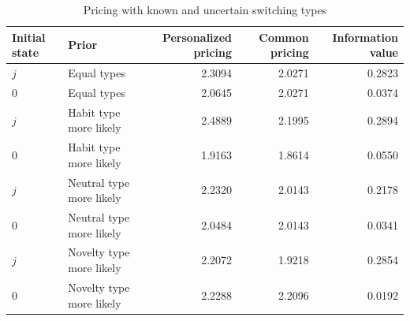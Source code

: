 \begin{table}[htbp]\centering\small
\caption{Pricing with known and uncertain switching types}
\label{tab:gamma-uncertainty}
\begin{tabular}{llrrr}\toprule
Initial state & Prior & Personalized pricing & Common pricing & Information value\\\midrule
$j$ & Equal types & 2.3094 & 2.0271 & 0.2823 \\
$0$ & Equal types & 2.0645 & 2.0271 & 0.0374 \\
$j$ & Habit type more likely & 2.4889 & 2.1995 & 0.2894 \\
$0$ & Habit type more likely & 1.9163 & 1.8614 & 0.0550 \\
$j$ & Neutral type more likely & 2.2320 & 2.0143 & 0.2178 \\
$0$ & Neutral type more likely & 2.0484 & 2.0143 & 0.0341 \\
$j$ & Novelty type more likely & 2.2072 & 1.9218 & 0.2854 \\
$0$ & Novelty type more likely & 2.2288 & 2.2096 & 0.0192 \\
\bottomrule\end{tabular}
\end{table}
